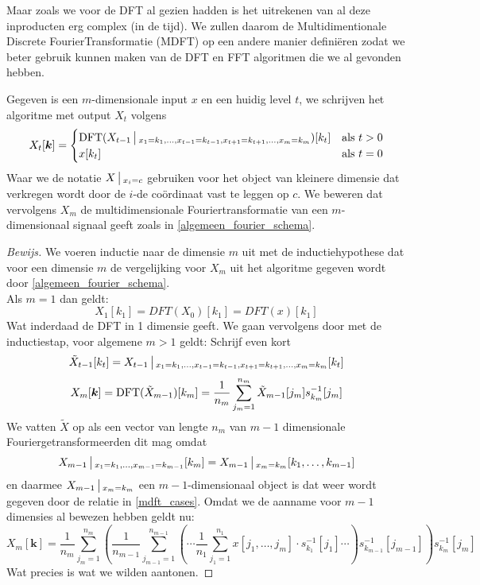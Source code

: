 Maar zoals we voor de DFT al gezien hadden is het uitrekenen van al deze inproducten erg complex (in de tijd).
We zullen daarom de Multidimentionale Discrete FourierTransformatie (MDFT) op een andere manier defini\"eren 
zodat we beter gebruik kunnen maken van de DFT en FFT algoritmen die we al gevonden hebben.

\begin{algo}
Gegeven is een $m$-dimensionale input $x$ en een huidig level $t$, 
we schrijven het algoritme met output $X_t$ volgens
\begin{equation}
  \label{mdft_cases}
  X_{t}[\boldsymbol k] = \begin{cases}
  \text{DFT}(X_{t-1}\,\big|\,_{x_1 = k_1,\ldots,x_{t-1} = k_{t-1},x_{t+1} = k_{t+1},\ldots,x_m =k_m})[k_t] & \text{als } t>0\\
  x[k_t] & \text{als } t=0
  \end{cases}
\end{equation}
Waar we de notatie $X\,\big|\,_{x_i=c}$ gebruiken voor het object van kleinere dimensie dat verkregen
wordt door de $i$-de co\"ordinaat vast te leggen op $c$.
We beweren dat vervolgens $X_m$ de multidimensionale Fouriertransformatie van een $m$-dimensionaal signaal geeft zoals
in \ref{algemeen_fourier_schema}.
\end{algo}
\begin{proof}[Bewijs]
We voeren inductie naar de dimensie $m$ uit met de inductiehypothese dat voor een dimensie $m$ 
de vergelijking voor $X_m$ uit het algoritme gegeven wordt door \ref{algemeen_fourier_schema}.\\ 
Als $m=1$ dan geldt:
\[
X_1[k_1] = DFT(X_0)[k_1] = DFT(x)[k_1]
\]
Wat inderdaad de DFT in 1 dimensie geeft.
We gaan vervolgens door met de inductiestap, voor algemene $m>1$ geldt:
Schrijf even kort
\[
\tilde X_{t-1}[k_t] = 
X_{t-1}\,\big|\,_{x_1 = k_1,\ldots,x_{t-1} = k_{t-1},x_{t+1} = k_{t+1},\ldots,x_m =k_m}[k_t]
\]
\[
  X_m [\boldsymbol k] = 
  \text{DFT}(\tilde X_{m-1})[k_m]
  = \frac 1 {n_m}\sum_{j_m=1}^{n_m} \tilde X_{m-1}[j_m] s^{-1}_{k_m}[j_m]
\]
We vatten $\tilde X$ op als een vector van lengte $n_m$ van $m-1$ dimensionale Fouriergetransformeerden
dit mag omdat
\[
X_{m-1}\,\big|\,_{x_1=k_1,\ldots,x_{m-1}=k_{m-1}}[k_m] = X_{m-1}\,\big|\,_{x_m=k_m}[k_1,\ldots,k_{m-1}]
\]
en daarmee $X_{m-1}\,\big|\,_{x_m=k_m}$ een $m-1$-dimensionaal object is dat weer wordt gegeven door de relatie
in \ref{mdft_cases}.
Omdat we de aanname voor $m-1$ dimensies al bewezen hebben geldt nu:
\[
X_m[\boldsymbol k]  = \frac 1 {n_m}\sum_{j_m=1}^{n_m} 
\left( \frac 1 {n_{m-1}} \sum_{j_{m-1}=1}^{n_{m-1}} \left ( \cdots 
\frac 1 {n_1} \sum_{j_1=1}^{n_1} 
x[j_1,\ldots,j_m] 
\cdot s^{-1}_{k_1}[j_1]
\cdots \right ) s^{-1}_{k_{m-1}}[j_{m-1}] \right) 
s^{-1}_{k_m}[j_m]
\]
Wat precies is wat we wilden aantonen.
\end{proof}

